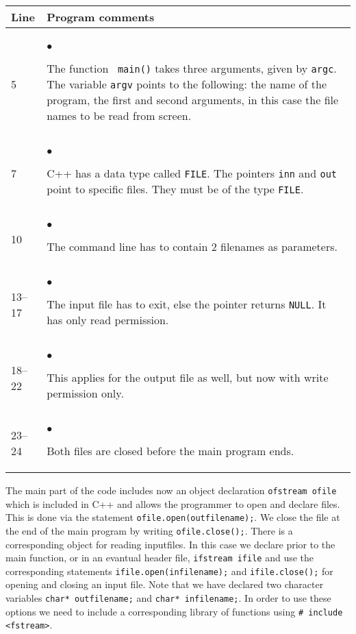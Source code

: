 {\small
\begin{center}
\begin{tabular}{|ll|}\hline
\hfill Line \hfill
& \hspace*{\fill} Program comments \hspace*{\fill} \\ \hline
&  \\[-2mm]
5 &$\bullet$
\begin{minipage}[t]{0.65\textwidth}
The function \verb? main()? takes three arguments, given by \verb?argc?.
The variable \verb?argv? points to the following: the name of the program, the first and second
arguments, in this case the file names to be read from screen.\vspace*{2mm} 
\end{minipage}\\
7 &$\bullet$
\begin{minipage}[t]{0.65\textwidth}
C++ has a data type called \verb?FILE?. The pointers \verb?inn? 
and \verb ?out? point to specific files. They must be of the type
\verb?FILE?.
\vspace*{2mm}
\end{minipage}\\
10 &$\bullet$
\begin{minipage}[t]{0.65\textwidth}
The command line has to contain 2 filenames as parameters.
\end{minipage}\\
13--17 &$\bullet$
\begin{minipage}[t]{0.65\textwidth}
The input file has to exit, else the pointer returns \verb?NULL?.
It has only read permission.
\end{minipage}\\
18--22 &$\bullet$
\begin{minipage}[t]{0.65\textwidth}
This applies for the output file as well, but now with write permission only.
\end{minipage}\\ 
23--24 &$\bullet$
\begin{minipage}[t]{0.65\textwidth}
Both files are closed before the main program ends.
\end{minipage}\\[2ex]
\hline
\end{tabular}
\end{center}
} %
%


The main part of the code includes now an object declaration \verb?ofstream ofile?
which is included in C++ and allows the programmer to open  and declare files.
This is done via the statement \verb?ofile.open(outfilename);?. We close the file
at the end of the main program by writing \verb?ofile.close();?.
There is a corresponding object for reading inputfiles. In this case we declare prior
to the main function, or in an evantual header file, \verb?ifstream ifile?
and use the corresponding statements \verb?ifile.open(infilename);?
and \verb?ifile.close();? for opening and closing an input file.
Note that we have declared two character variables \verb?char* outfilename;?
and \verb?char* infilename;?. In order to use these options we need to include a 
corresponding library of functions using \verb?# include <fstream>?.

